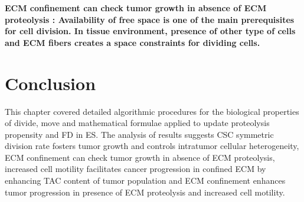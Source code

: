 \bfseries{ECM confinement can check tumor growth in absence of ECM proteolysis}
    \normalfont : 
    Availability of free space is one of the main prerequisites for cell division. In tissue environment, 
    presence of other type of cells and ECM fibers creates a space constraints for dividing cells. 

\section{Conclusion}
This chapter covered detailed algorithmic procedures for the biological properties of divide, move 
and mathematical formulae applied to update proteolysis propensity and FD in ES.
The analysis of results suggests CSC symmetric division rate fosters tumor growth and controls intratumor cellular heterogeneity, 
ECM confinement can check tumor growth in absence of ECM proteolysis, 
increased cell motility facilitates cancer progression in confined ECM by enhancing TAC content of tumor population and ECM confinement enhances tumor progression in presence of ECM proteolysis and increased cell motility.

